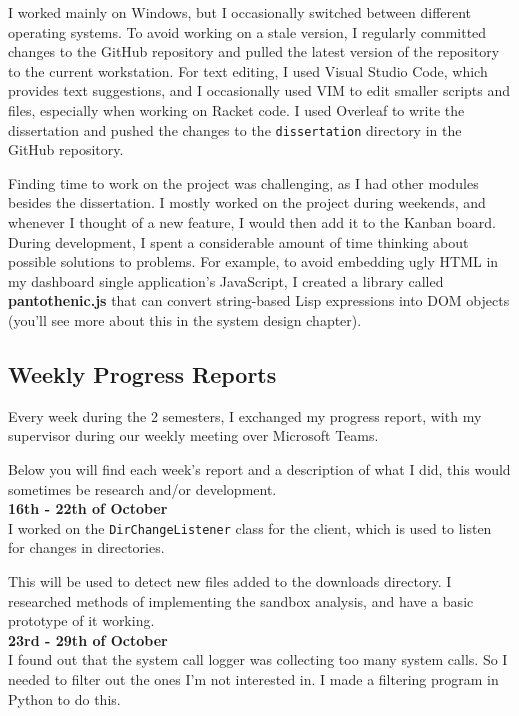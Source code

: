 I worked mainly on Windows, but I occasionally switched
between different operating systems. To avoid working on
a stale version, I regularly committed changes to the
GitHub repository and pulled the latest version of the
repository to the current workstation. For text editing,
I used Visual Studio Code, which provides text suggestions,
and I occasionally used VIM to edit smaller scripts and files,
especially when working on Racket code.
I used Overleaf to write the dissertation and pushed the changes to the
\texttt{dissertation} directory in the GitHub repository.

Finding time to work on the project was challenging,
as I had other modules besides the dissertation.
I mostly worked on the project during weekends, and whenever
I thought of a new feature, I would then add it to the Kanban board.
During development, I spent a considerable amount of time thinking
about possible solutions to problems. For example,
to avoid embedding ugly HTML in my dashboard single application's JavaScript,
I created a library called \textbf{pantothenic.js} that can convert 
string-based Lisp expressions into DOM objects
(you'll see more about this in the system design chapter).

\subsection{Weekly Progress Reports}
Every week during the 2 semesters, I exchanged my progress report,
with my supervisor during our weekly meeting over Microsoft Teams.

Below you will find each week's report and a description of what I did,
this would sometimes be research and/or development. \\

\textbf{16th - 22th of October} \\
I worked on the \texttt{DirChangeListener} class for the client,
which is used to listen for changes in directories.

This will be used to detect new files added to the downloads directory.
I researched methods of implementing the sandbox analysis,
and have a basic prototype of it working. \\

\textbf{23rd - 29th of October} \\
I found out that the system call logger was collecting too many system calls.
So I needed to filter out the ones I'm not interested in.
I made a filtering program in Python to do this.

